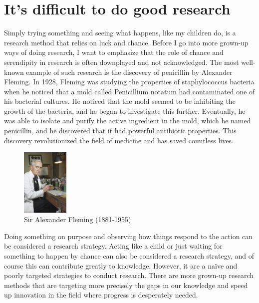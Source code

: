 \documentclass[
  12pt,
  oneside]{book}
\theoremstyle{definition}
\theoremstyle{definition}
\theoremstyle{definition}
\theoremstyle{definition}
\theoremstyle{remark}
\begin{document}
\hypertarget{its-difficult-to-do-good-research}{%
\section{It's difficult to do good research}\label{its-difficult-to-do-good-research}}

Simply trying something and seeing what happens, like my children do, is a research method that relies on luck and chance. Before I go into more grown-up ways of doing research, I want to emphasize that the role of chance and serendipity in research is often downplayed and not acknowledged. The most well-known example of such research is the discovery of penicillin by Alexander Fleming. In 1928, Fleming was studying the properties of staphylococcus bacteria when he noticed that a mold called Penicillium notatum had contaminated one of his bacterial cultures. He noticed that the mold seemed to be inhibiting the growth of the bacteria, and he began to investigate this further. Eventually, he was able to isolate and purify the active ingredient in the mold, which he named penicillin, and he discovered that it had powerful antibiotic properties. This discovery revolutionized the field of medicine and has saved countless lives.

\begin{figure}
\centering
\includegraphics[width=0.2\textwidth,height=\textheight]{fig/Synthetic_Production_of_Penicillin_TR1468.jpg}
\caption[\label{fig:fleming} Sir Alexander Fleming (1881-1955)]{\label{fig:fleming} Sir Alexander Fleming (1881-1955)\footnotemark{}}
\end{figure}

Doing something on purpose and observing how things respond to the action can be considered a research strategy. Acting like a child or just waiting for something to happen by chance can also be considered a research strategy, and of course this can contribute greatly to knowledge. However, it are a naïve and poorly targeted strategies to conduct research. There are more grown-up research methods that are targeting more precisely the gaps in our knowledge and speed up innovation in the field where progress is desperately needed.
\end{document}
